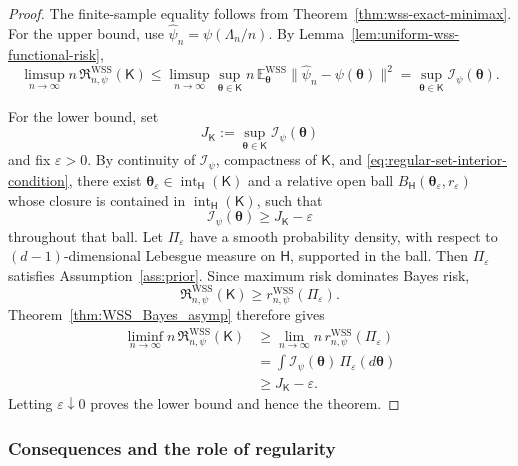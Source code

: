\documentclass{article}
\theoremstyle{named}
\theoremstyle{named1}
\newcommand{\E}{\mathbb{E}}
\newcommand{\WSS}{\mathrm{WSS}}
\newcommand{\btheta}{\boldsymbol{\theta}}
\newcommand{\cI}{\mathcal{I}}
\theoremstyle{plain}
\theoremstyle{remark}
\begin{document}
\begin{proof}
The finite-sample equality follows from
Theorem~\ref{thm:wss-exact-minimax}. For the upper bound, use \(\widehat\psi_n=\psi(\Lambda_n/n)\). By
Lemma~\ref{lem:uniform-wss-functional-risk},
\begin{equation}
    \limsup_{n\to\infty}
      n\,\mathfrak R_{n,\psi}^{\WSS}(\mathsf K)
    \leq
    \limsup_{n\to\infty}
      \sup_{\btheta\in\mathsf K}
      n\,\E_{\btheta}^{\WSS}
      \|\widehat\psi_n-\psi(\btheta)\|^2
    =\sup_{\btheta\in\mathsf K}\cI_\psi(\btheta). \label{eq:global-minimax-upper}
\end{equation}


For the lower bound, set
\[
    J_{\mathsf K}:=\sup_{\btheta\in\mathsf K}\cI_\psi(\btheta)
\]
and fix \(\varepsilon>0\). By continuity of \(\cI_\psi\), compactness
of \(\mathsf K\), and
\eqref{eq:regular-set-interior-condition}, there exist
\(\btheta_\varepsilon\in
\operatorname{int}_{\mathsf H}(\mathsf K)\) and a relative open ball
\(B_{\mathsf H}(\btheta_\varepsilon,r_\varepsilon)\) whose closure is
contained in \(\operatorname{int}_{\mathsf H}(\mathsf K)\), such that
\[
    \cI_\psi(\btheta)\geq J_{\mathsf K}-\varepsilon
\]
throughout that ball. Let \(\Pi_\varepsilon\) have a smooth probability
density, with respect to \((d-1)\)-dimensional Lebesgue measure on
\(\mathsf H\), supported in the ball. Then
\(\Pi_\varepsilon\) satisfies Assumption~\ref{ass:prior}. Since maximum
risk dominates Bayes risk,
\[
    \mathfrak R_{n,\psi}^{\WSS}(\mathsf K)
    \geq r_{n,\psi}^{\WSS}(\Pi_\varepsilon).
\]
Theorem~\ref{thm:WSS_Bayes_asymp} therefore gives
\[
\begin{aligned}
    \liminf_{n\to\infty}
      n\,\mathfrak R_{n,\psi}^{\WSS}(\mathsf K)
    &\geq
    \lim_{n\to\infty}
      n\,r_{n,\psi}^{\WSS}(\Pi_\varepsilon)\\
    &=\int\cI_\psi(\btheta)\,\Pi_\varepsilon(d\btheta)\\
    &\geq J_{\mathsf K}-\varepsilon.
\end{aligned}
\]
Letting \(\varepsilon\downarrow0\) proves the lower bound and hence
the theorem.
\end{proof}

\subsubsection{Consequences and the role of regularity}
\end{document}
